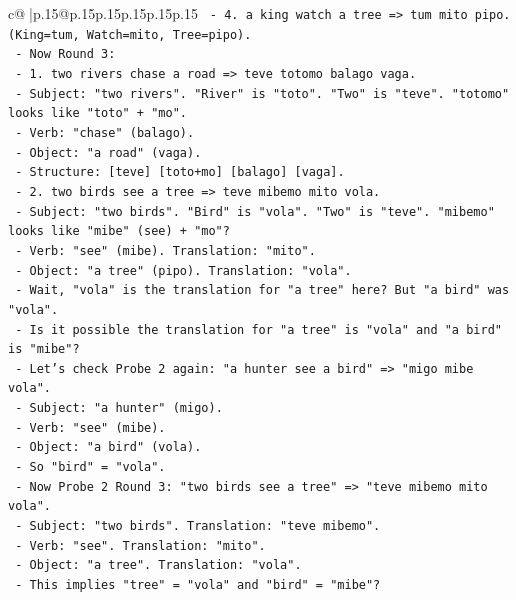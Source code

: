 \documentclass{article}
\begin{document}
{\begin{supertabular}{c@{$\;$}|p{.15\linewidth}@{}p{.15\linewidth}p{.15\linewidth}p{.15\linewidth}p{.15\linewidth}p{.15\linewidth}}
{{{\texttt{      {-} 4. a king watch a tree => tum mito pipo. (King=tum, Watch=mito, Tree=pipo).} \\
\texttt{    {-} Now Round 3:} \\
\texttt{      {-} 1. two rivers chase a road => teve totomo balago vaga.} \\
\texttt{        {-} Subject: "two rivers". "River" is "toto". "Two" is "teve". "totomo" looks like "toto" + "mo".} \\
\texttt{        {-} Verb: "chase" (balago).} \\
\texttt{        {-} Object: "a road" (vaga).} \\
\texttt{        {-} Structure: {[}teve{]} {[}toto+mo{]} {[}balago{]} {[}vaga{]}.} \\
\texttt{      {-} 2. two birds see a tree => teve mibemo mito vola.} \\
\texttt{        {-} Subject: "two birds". "Bird" is "vola". "Two" is "teve". "mibemo" looks like "mibe" (see) + "mo"?} \\
\texttt{        {-} Verb: "see" (mibe). Translation: "mito".} \\
\texttt{        {-} Object: "a tree" (pipo). Translation: "vola".} \\
\texttt{        {-} Wait, "vola" is the translation for "a tree" here? But "a bird" was "vola".} \\
\texttt{        {-} Is it possible the translation for "a tree" is "vola" and "a bird" is "mibe"?} \\
\texttt{        {-} Let's check Probe 2 again: "a hunter see a bird" => "migo mibe vola".} \\
\texttt{          {-} Subject: "a hunter" (migo).} \\
\texttt{          {-} Verb: "see" (mibe).} \\
\texttt{          {-} Object: "a bird" (vola).} \\
\texttt{          {-} So "bird" = "vola".} \\
\texttt{        {-} Now Probe 2 Round 3: "two birds see a tree" => "teve mibemo mito vola".} \\
\texttt{          {-} Subject: "two birds". Translation: "teve mibemo".} \\
\texttt{          {-} Verb: "see". Translation: "mito".} \\
\texttt{          {-} Object: "a tree". Translation: "vola".} \\
\texttt{          {-} This implies "tree" = "vola" and "bird" = "mibe"?} \\
}}}
\end{supertabular}}
\end{document}
